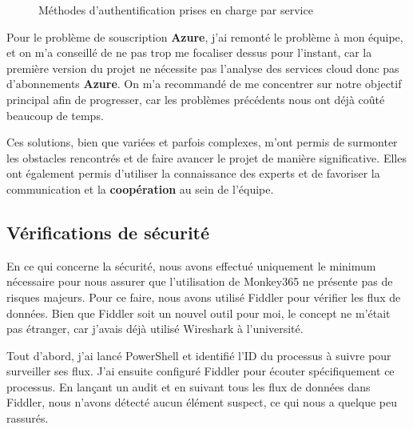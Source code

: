 \begin{figure}[H]
    \begin{center}
        \caption{Méthodes d'authentification prises en charge par service}
    \end{center}
\end{figure}

Pour le problème de souscription \textbf{Azure}, j'ai remonté le problème à mon équipe, et on m'a conseillé de ne pas trop me focaliser dessus pour l'instant, car la première version du projet ne nécessite pas l'analyse des services cloud donc pas d'abonnements \textbf{Azure}. On m'a recommandé de me concentrer sur notre objectif principal afin de progresser, car les problèmes précédents nous ont déjà coûté beaucoup de temps.

Ces solutions, bien que variées et parfois complexes, m'ont permis de surmonter les obstacles rencontrés et de faire avancer le projet de manière significative. Elles ont également permis d'utiliser la connaissance des experts et de favoriser la communication et la \textbf{coopération} au sein de l'équipe.

\subsection{Vérifications de sécurité}

En ce qui concerne la sécurité, nous avons effectué uniquement le minimum nécessaire pour nous assurer que l'utilisation de Monkey365 ne présente pas de risques majeurs. Pour ce faire, nous avons utilisé Fiddler pour vérifier les flux de données. Bien que Fiddler soit un nouvel outil pour moi, le concept ne m'était pas étranger, car j'avais déjà utilisé Wireshark à l'université.

Tout d'abord, j'ai lancé PowerShell et identifié l'ID du processus à suivre pour surveiller ses flux. J'ai ensuite configuré Fiddler pour écouter spécifiquement ce processus. En lançant un audit et en suivant tous les flux de données dans Fiddler, nous n'avons détecté aucun élément suspect, ce qui nous a quelque peu rassurés.

